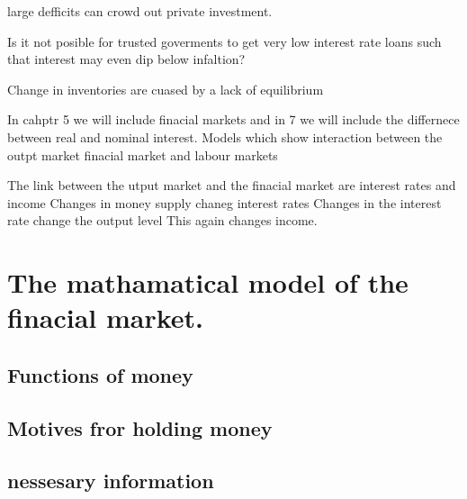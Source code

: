 \documentclass[twocolumn]{article}
\begin{document}
large defficits can crowd out private investment.

Is it not posible for trusted goverments to get very low interest rate
loans such that interest may even dip below infaltion?

Change in inventories are cuased by a lack of equilibrium

In cahptr 5 we will include finacial markets and in 7 we will include
the differnece between real and nominal interest. Models which show
interaction between the outpt market finacial market and labour markets

The link between the utput market and the finacial market are interest
rates and income Changes in money supply chaneg interest rates Changes
in the interest rate change the output level This again changes income.

\hypertarget{the-mathamatical-model-of-the-finacial-market.}{%
\section{The mathamatical model of the finacial
market.}\label{the-mathamatical-model-of-the-finacial-market.}}

\hypertarget{functions-of-money}{%
\subsection{Functions of money}\label{functions-of-money}}

\hypertarget{motives-fror-holding-money}{%
\subsection{Motives fror holding
money}\label{motives-fror-holding-money}}

\hypertarget{nessesary-information}{%
\subsection{nessesary information}\label{nessesary-information}}
\end{document}
